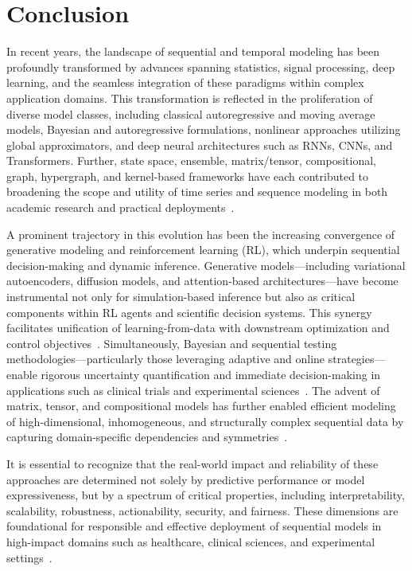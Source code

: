 \documentclass[11pt]{article}
\begin{document}
\section{Conclusion}

In recent years, the landscape of sequential and temporal modeling has been profoundly transformed by advances spanning statistics, signal processing, deep learning, and the seamless integration of these paradigms within complex application domains. This transformation is reflected in the proliferation of diverse model classes, including classical autoregressive and moving average models, Bayesian and autoregressive formulations, nonlinear approaches utilizing global approximators, and deep neural architectures such as RNNs, CNNs, and Transformers. Further, state space, ensemble, matrix/tensor, compositional, graph, hypergraph, and kernel-based frameworks have each contributed to broadening the scope and utility of time series and sequence modeling in both academic research and practical deployments~\cite{ref2,ref7,ref8,ref10,ref11,ref14,ref15,ref16,ref19,ref20,ref24,ref25,ref31,ref32,ref33,ref34,ref35,ref37,ref38,ref39,ref40,ref51,ref55,ref62,ref63,ref64,ref66,ref67,ref73,ref75,ref79,ref83,ref84,ref85,ref86,ref87}.

A prominent trajectory in this evolution has been the increasing convergence of generative modeling and reinforcement learning (RL), which underpin sequential decision-making and dynamic inference. Generative models—including variational autoencoders, diffusion models, and attention-based architectures—have become instrumental not only for simulation-based inference but also as critical components within RL agents and scientific decision systems. This synergy facilitates unification of learning-from-data with downstream optimization and control objectives~\cite{ref62,ref63,ref64,ref66,ref67,ref75,ref79,ref86,ref87}. Simultaneously, Bayesian and sequential testing methodologies—particularly those leveraging adaptive and online strategies—enable rigorous uncertainty quantification and immediate decision-making in applications such as clinical trials and experimental sciences~\cite{ref16,ref51,ref64,ref73,ref75,ref84}. The advent of matrix, tensor, and compositional models has further enabled efficient modeling of high-dimensional, inhomogeneous, and structurally complex sequential data by capturing domain-specific dependencies and symmetries~\cite{ref14,ref37,ref39,ref40,ref62}.

It is essential to recognize that the real-world impact and reliability of these approaches are determined not solely by predictive performance or model expressiveness, but by a spectrum of critical properties, including interpretability, scalability, robustness, actionability, security, and fairness. These dimensions are foundational for responsible and effective deployment of sequential models in high-impact domains such as healthcare, clinical sciences, and experimental settings~\cite{ref2,ref7,ref8,ref19,ref24,ref32,ref33,ref35,ref38,ref51,ref55,ref62,ref63,ref64,ref66,ref73,ref85}.
\end{document}
